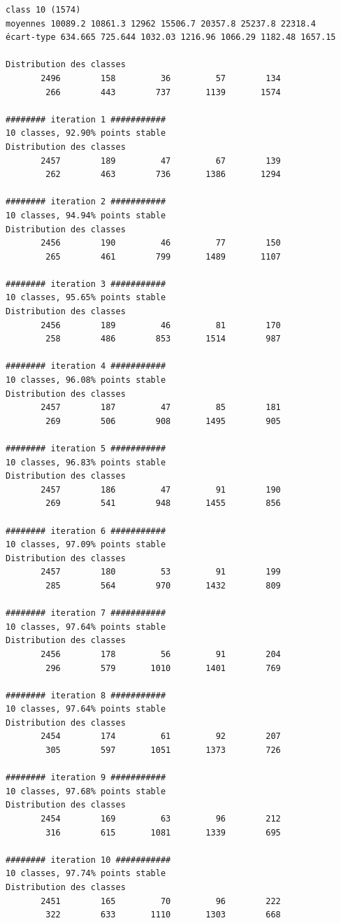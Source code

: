 \documentclass[earth,article,accept,pdftex,moreauthors]{Definitions/mdpi}
\begin{document}
{\begin{scriptsize}
\begin{verbatim}
class 10 (1574)
moyennes 10089.2 10861.3 12962 15506.7 20357.8 25237.8 22318.4
écart-type 634.665 725.644 1032.03 1216.96 1066.29 1182.48 1657.15

Distribution des classes
       2496        158         36         57        134
        266        443        737       1139       1574

######## iteration 1 ###########
10 classes, 92.90% points stable
Distribution des classes
       2457        189         47         67        139
        262        463        736       1386       1294

######## iteration 2 ###########
10 classes, 94.94% points stable
Distribution des classes
       2456        190         46         77        150
        265        461        799       1489       1107

######## iteration 3 ###########
10 classes, 95.65% points stable
Distribution des classes
       2456        189         46         81        170
        258        486        853       1514        987

######## iteration 4 ###########
10 classes, 96.08% points stable
Distribution des classes
       2457        187         47         85        181
        269        506        908       1495        905

######## iteration 5 ###########
10 classes, 96.83% points stable
Distribution des classes
       2457        186         47         91        190
        269        541        948       1455        856

######## iteration 6 ###########
10 classes, 97.09% points stable
Distribution des classes
       2457        180         53         91        199
        285        564        970       1432        809

######## iteration 7 ###########
10 classes, 97.64% points stable
Distribution des classes
       2456        178         56         91        204
        296        579       1010       1401        769

######## iteration 8 ###########
10 classes, 97.64% points stable
Distribution des classes
       2454        174         61         92        207
        305        597       1051       1373        726

######## iteration 9 ###########
10 classes, 97.68% points stable
Distribution des classes
       2454        169         63         96        212
        316        615       1081       1339        695

######## iteration 10 ###########
10 classes, 97.74% points stable
Distribution des classes
       2451        165         70         96        222
        322        633       1110       1303        668


\end{verbatim}
\end{scriptsize}}
\end{document}
